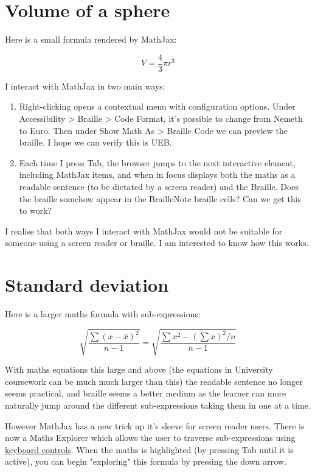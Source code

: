 \documentclass{article}
\begin{document}
\section{Volume of a sphere}

Here is a small formula rendered by MathJax:

$$
V=\frac{4}{3} \pi r^3
$$

I interact with MathJax in two main ways:

\begin{enumerate}
  \item Right-clicking opens a contextual menu with configuration options.  Under Accessibility > Braille > Code Format, it's possible to change from Nemeth to Euro.  Then under Show Math As > Braille Code we can preview the braille.  I hope we can verify this is UEB.

  \item Each time I press Tab, the browser jumps to the next interactive element, including MathJax items, and when in focus displays both the maths as a readable sentence (to be dictated by a screen reader) and the Braille.  Does the braille somehow appear in the BrailleNote braille cells?  Can we get this to work?
\end{enumerate}

I realise that both ways I interact with MathJax would not be suitable for someone using a screen reader or braille.  I am interested to know how this works.

\section{Standard deviation}

Here is a larger maths formula with sub-expressions:

$$
\sqrt{\frac{\sum(x-\bar{x})^2}{n-1}}=\sqrt{\frac{\sum x^2-\left(\sum x\right)^2 / n}{n-1}}
$$

With maths equations this large and above (the equations in University coursework can be much much larger than this) the readable sentence no longer seems practical, and braille seems a better medium as the learner can more naturally jump around the different sub-expressions taking them in one at a time.

However MathJax has a new trick up it's sleeve for screen reader users. There is now a Maths Explorer which allows the user to traverse sub-expressions using \href{https://docs.mathjax.org/en/latest/basic/explorer-commands.html}{keyboard controls}. When the maths is highlighted (by pressing Tab until it is active), you can begin "exploring" this formula by pressing the down arrow.
\end{document}
